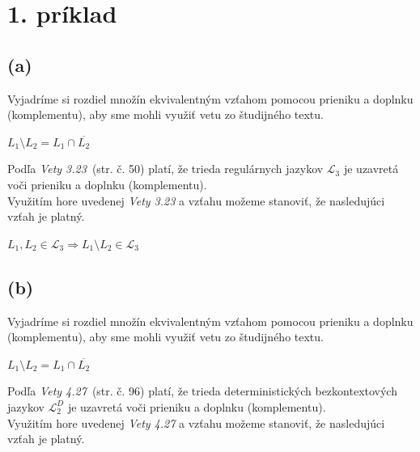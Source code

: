 \documentclass[11pt,a4paper]{article}
\begin{document}
\newpage

\section{1. príklad} %

\subsection{(a)} %

Vyjadríme si rozdiel množín ekvivalentným vzťahom pomocou prieniku a doplnku (komplementu), aby sme mohli využiť vetu zo študijného textu.
\begin{center}
$L_1 \setminus L_2 = L_1 \cap \overline{L_2}$
\end{center}

Podľa \textit{Vety 3.23}~\cite{TIN}(str. č. 50) platí, že trieda regulárnych jazykov $\mathcal{L}_3$ je uzavretá voči prieniku a doplnku (komplementu).\\

Využitím hore uvedenej \textit{Vety 3.23} a vzťahu možeme stanoviť, že nasledujúci vzťah je platný.

\begin{center}
$L_1,L_2 \in \mathcal{L}_3 \Rightarrow L_1 \setminus L_2 \in \mathcal{L}_3$
\end{center}

\subsection{(b)} %

Vyjadríme si rozdiel množín ekvivalentným vzťahom pomocou prieniku a doplnku (komplementu), aby sme mohli využiť vetu zo študijného textu.
\begin{center}
$L_1 \setminus L_2 = L_1 \cap \overline{L_2}$
\end{center}

Podľa \textit{Vety 4.27}~\cite{TIN}(str. č. 96) platí, že trieda deterministických bezkontextových jazykov $\mathcal{L}_2^D$ je uzavretá voči prieniku a doplnku (komplementu).\\

Využitím hore uvedenej \textit{Vety 4.27} a vzťahu možeme stanoviť, že nasledujúci vzťah je platný.
\end{document}
